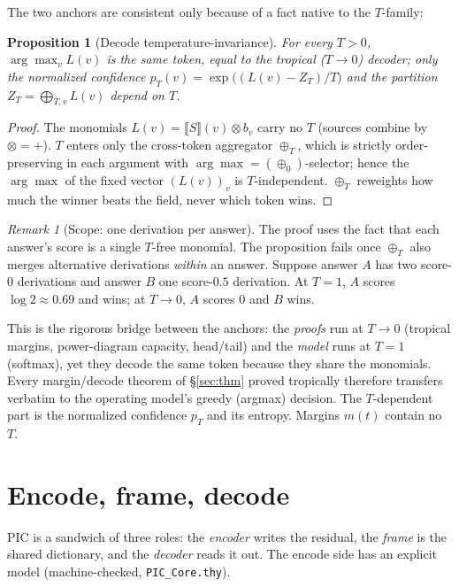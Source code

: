 \documentclass[11pt]{article}
\theoremstyle{definition}
\theoremstyle{plain}
\newtheorem{proposition}[theorem]{Proposition}
\theoremstyle{remark}
\newtheorem{remark}[theorem]{Remark}
\begin{document}
\noindent The two anchors are consistent only because of a fact native to the $T$-family:

\begin{proposition}[Decode temperature-invariance]\label{lem:tinv}
For every $T>0$, $\arg\max_v L(v)$ is the same token, equal to the tropical ($T\to0$) decoder; only the
normalized confidence $p_T(v)=\exp\bigl((L(v)-Z_T)/T\bigr)$ and the partition $Z_T=\bigoplus_{T,v}L(v)$
depend on $T$.
\end{proposition}
\begin{proof}
The monomials $L(v)=\llbracket S\rrbracket(v)\otimes b_v$ carry no $T$ (sources combine by $\otimes=+$).
$T$ enters only the cross-token aggregator $\oplus_T$, which is strictly order-preserving in each
argument with $\arg\max=(\oplus_0)$-selector; hence the $\arg\max$ of the fixed vector $(L(v))_v$ is
$T$-independent. $\oplus_T$ reweights how much the winner beats the field, never which token wins.
\end{proof}

\begin{remark}[Scope: one derivation per answer]\label{rem:tinv-scope}
The proof uses the fact that each answer's score is a single $T$-free monomial. The proposition fails
once $\oplus_T$ also merges alternative derivations \emph{within} an answer. Suppose answer $A$ has two
score-$0$ derivations and answer $B$ one score-$0.5$ derivation. At $T=1$, $A$ scores $\log2\approx0.69$
and wins; at $T\to0$, $A$ scores $0$ and $B$ wins.
\end{remark}

This is the rigorous bridge between the anchors: the \emph{proofs} run at $T\to0$ (tropical margins,
power-diagram capacity, head/tail) and the \emph{model} runs at $T=1$ (softmax), yet they decode the same
token because they share the monomials. Every margin/decode theorem of \S\ref{sec:thm} proved tropically
therefore transfers verbatim to the operating model's greedy (argmax) decision. The $T$-dependent part
is the normalized confidence $p_T$ and its entropy. Margins $m(t)$ contain no $T$.

\section{Encode, frame, decode}\label{sec:sep}

PIC is a sandwich of three roles: the \emph{encoder} writes the residual, the \emph{frame} is the shared
dictionary, and the \emph{decoder} reads it out. The encode side has an explicit model
(machine-checked, \texttt{PIC\_Core.thy}).
\end{document}
